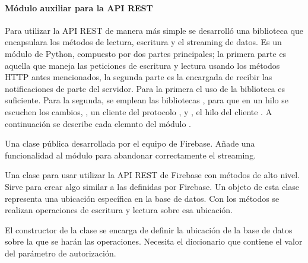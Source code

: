 \paragraph{Módulo auxiliar para la API REST}
\label{\detokenize{nao_firebase:modulo-auxiliar-para-la-api-rest}}
Para utilizar la API REST de manera más simple se desarrolló una biblioteca
que encapsulara los métodos de lectura, escritura y el streaming de datos.
Es un módulo de Python, compuesto por dos partes principales; la primera parte
es aquella que maneja las peticiones de escritura y lectura usando los métodos
HTTP antes mencionados, la segunda parte es la encargada de recibir las
notificaciones de parte del servidor. Para la primera el uso de la biblioteca
 es suficiente. Para la segunda, se emplean las bibliotecas
, para que en un hilo se escuchen los cambios, ,
un cliente del protocolo , y , el hilo del cliente .
A continuación se describe cada elemnto del módulo .
\newline

Una clase pública desarrollada por el equipo de Firebase.
Añade una funcionalidad al módulo  para
abandonar correctamente el streaming.

Una clase para usar utilizar la API REST de Firebase con métodos de alto nivel.
Sirve para crear algo similar a las  definidas por Firebase.
Un objeto de esta clase representa una ubicación específica en la base de datos.
Con los métodos se realizan operaciones de escritura y lectura sobre esa ubicación.

El constructor de la clase se encarga de definir la ubicación de la base de datos
sobre la que se harán las operaciones.
Necesita el diccionario  que contiene el valor del parámetro de autorización.

